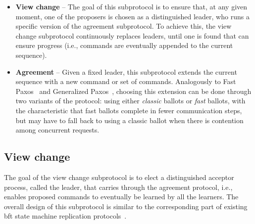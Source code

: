 \begin{itemize}
	
	\item
	{\bf View change} -- The goal of this subprotocol is to ensure that, at any given moment, one of the proposers is chosen as a distinguished leader, who runs a specific version of the agreement subprotocol. To achieve this, the view change subprotocol continuously replaces leaders, until one is found that can ensure progress (i.e., commands are eventually appended to the current sequence).
	
	\item
	{\bf Agreement} -- Given a fixed leader, this subprotocol extends the current sequence with a new command or set of commands. Analogously to Fast Paxos~\cite{L06} and Generalized Paxos~\cite{Lamport2005}, choosing this extension can be done through two variants of the protocol: using either \textit{classic} ballots or \textit{fast} ballots, with the characteristic that fast ballots complete in fewer communication steps, but may have to fall back to using a classic ballot when there is contention among concurrent requests.
	
\end{itemize}

\subsection{View change} 

The goal of the view change subprotocol is to elect a distinguished acceptor process, called the leader, that carries through the agreement protocol, i.e., enables proposed commands to eventually be learned by all the learners. The overall design of this subprotocol is similar to the corresponding part of existing \acrshort{bft} state machine replication protocols~\cite{CL99}.\par

